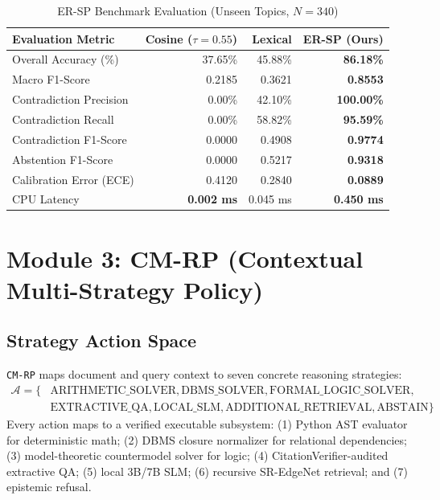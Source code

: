 \documentclass[conference]{IEEEtran}
\begin{document}
\begin{table}[htbp]
\caption{ER-SP Benchmark Evaluation (Unseen Topics, $N = 340$)}
\begin{center}
\begin{tabular}{lrrr}
\toprule
\textbf{Evaluation Metric} & \textbf{Cosine ($\tau=0.55$)} & \textbf{Lexical} & \textbf{ER-SP (Ours)} \\
\midrule
Overall Accuracy (\%) & 37.65\% & 45.88\% & \textbf{86.18\%} \\
Macro F1-Score & 0.2185 & 0.3621 & \textbf{0.8553} \\
Contradiction Precision & 0.00\% & 42.10\% & \textbf{100.00\%} \\
Contradiction Recall & 0.00\% & 58.82\% & \textbf{95.59\%} \\
Contradiction F1-Score & 0.0000 & 0.4908 & \textbf{0.9774} \\
Abstention F1-Score & 0.0000 & 0.5217 & \textbf{0.9318} \\
Calibration Error (ECE) & 0.4120 & 0.2840 & \textbf{0.0889} \\
CPU Latency & \textbf{0.002 ms} & 0.045 ms & \textbf{0.450 ms} \\
\bottomrule
\end{tabular}
\end{center}
\end{table}

\section{Module 3: CM-RP (Contextual Multi-Strategy Policy)}
\subsection{Strategy Action Space}
\texttt{CM-RP} maps document and query context to seven concrete reasoning strategies:
\begin{align}
\mathcal{A} = \{&\text{ARITHMETIC\_SOLVER}, \text{DBMS\_SOLVER}, \text{FORMAL\_LOGIC\_SOLVER}, \nonumber \\
&\text{EXTRACTIVE\_QA}, \text{LOCAL\_SLM}, \text{ADDITIONAL\_RETRIEVAL}, \text{ABSTAIN}\}
\end{align}
Every action maps to a verified executable subsystem: (1) Python AST evaluator for deterministic math; (2) DBMS closure normalizer for relational dependencies; (3) model-theoretic countermodel solver for logic; (4) CitationVerifier-audited extractive QA; (5) local 3B/7B SLM; (6) recursive SR-EdgeNet retrieval; and (7) epistemic refusal.
\end{document}
